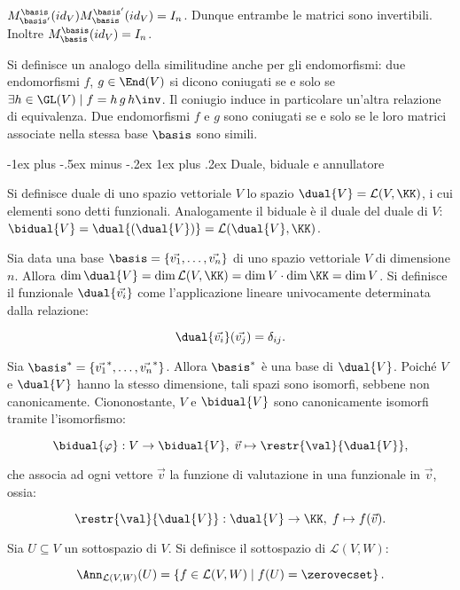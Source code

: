 \documentclass[10pt,landscape]{article}
\makeatletter
\renewcommand{\subsubsection}{\@startsection{subsubsection}{3}{0mm}%
	{-1ex plus -.5ex minus -.2ex}%
	{1ex plus .2ex}%
	{\normalfont\small\bfseries}}
\makeatother
\begin{document}
\begin{multicols}{3}
		$M^\basis_{\basis'}(id_V) M^{\basis'}_\basis(id_V)
		= I_n$. Dunque entrambe le matrici sono invertibili. Inoltre
		$M^\basis_\basis(id_V) = I_n$.
		
		Si definisce un analogo della similitudine anche per gli endomorfismi:
		due endomorfismi $f$, $g \in \End(V)$ si dicono coniugati se e solo se $\exists
		h \in \GL(V) \mid f = h \, g \, h\inv$. Il coniugio induce in particolare
		un'altra relazione di equivalenza. Due endomorfismi $f$ e $g$ sono coniugati
		se e solo se le loro matrici associate nella stessa base $\basis$ sono simili.
		
		\subsubsection{Duale, biduale e annullatore}
		
		Si definisce duale di uno spazio vettoriale $V$ lo
		spazio $\dual{V} = \mathcal{L}(V, \KK)$, i cui elementi
		sono detti funzionali. Analogamente
		il biduale è il duale del duale di $V$: $\bidual{V} = \dual{(\dual{V})} = \mathcal{L}(\dual{V}, \KK)$.
		
		Sia data una base $\basis = \{\vec{v_1}, \ldots, \vec{v_n}\}$ di
		uno spazio vettoriale $V$ di dimensione $n$. Allora $\dim \dual{V}
		= \dim \mathcal{L}(V, \KK) = \dim V \cdot \dim \KK = \dim V$. Si definisce
		il funzionale $\dual{\vec{v_i}}$ come l'applicazione lineare
		univocamente determinata dalla relazione:
		
		\[ \dual{\vec{v_i}}(\vec{v_j}) = \delta_{ij}. \]
		
		\vskip 0.05in
		
		Sia $\basis^* = \{\vec{v_1}^*, \ldots, \vec{v_n}^*\}$. Allora
		$\basis^*$ è una base di $\dual{V}$. Poiché $V$ e $\dual{V}$
		hanno la stesso dimensione, tali spazi sono isomorfi, sebbene
		non canonicamente. Ciononostante, $V$ e $\bidual{V}$ sono
		canonicamente isomorfi tramite l'isomorfismo:
		
		\[ \bidual{\varphi} : V \to \bidual{V}, \; \vec{v} \mapsto \restr{\val}{\dual{V}}, \]
		
		che associa ad ogni vettore $\vec{v}$ la funzione
		di valutazione in una funzionale in $\vec{v}$, ossia:
		
		\[ \restr{\val}{\dual{V}} : \dual{V} \to \KK, \; f \mapsto f(\vec{v}). \]
		
		Sia $U \subseteq V$ un sottospazio di $V$.
		Si definisce il sottospazio di $\mathcal{L}(V, W)$:
		
		\[ \Ann_{\mathcal{L}(V, W)}(U) = \left\{ f \in \mathcal{L}(V, W) \mid f(U) = \zerovecset \right\}. \]
		

\end{multicols}
\end{document}
